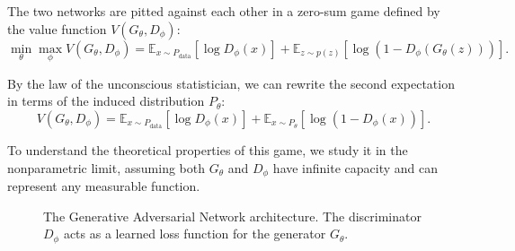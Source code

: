 The two networks are pitted against each other in a zero-sum game defined by the value function $V(G_\theta, D_\phi)$:
\begin{equation}
    \min_\theta \max_\phi V(G_\theta, D_\phi) = \mathbb{E}_{x \sim P_{\text{data}}} [\log D_\phi(x)] + \mathbb{E}_{z \sim p(z)} [\log (1 - D_\phi(G_\theta(z)))].
\end{equation}

By the law of the unconscious statistician, we can rewrite the second expectation in terms of the induced distribution $P_\theta$:
\begin{equation}
    V(G_\theta, D_\phi) = \mathbb{E}_{x \sim P_{\text{data}}} [\log D_\phi(x)] + \mathbb{E}_{x \sim P_\theta} [\log (1 - D_\phi(x))].
\end{equation}

To understand the theoretical properties of this game, we study it in the nonparametric limit, assuming both $G_\theta$ and $D_\phi$ have infinite capacity and can represent any measurable function.

\begin{figure}[htpb]
\centering
{}
\caption{The Generative Adversarial Network architecture. The discriminator $D_\phi$ acts as a learned loss function for the generator $G_\theta$.}
\label{fig:gan_arch}
\end{figure}


